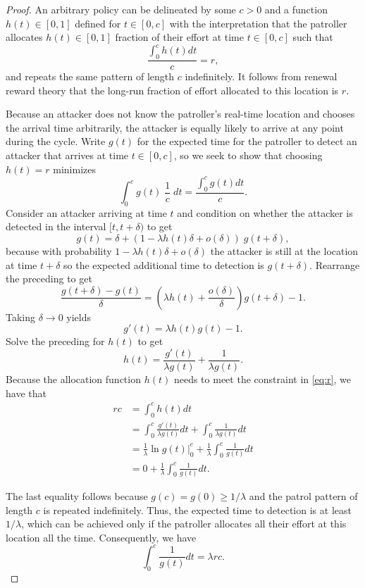 \documentclass[11pt,a4paper]{article}
\begin{document}
\begin{proof}
An arbitrary policy can be delineated by some $c > 0$ and a function $h(t) \in [0,1]$ defined for $t \in [0,c]$ with the interpretation that the patroller allocates $h(t) \in [0,1]$ fraction of their effort at time $t \in [0,c]$ such that
\begin{equation}
\frac{\int_0^c h(t) dt}{c} = r,
\label{eq:r}
\end{equation}
and repeats the same pattern of length $c$ indefinitely.
It follows from renewal reward theory that the long-run fraction of effort allocated to this location is $r$.


Because an attacker does not know the patroller's real-time location and chooses the arrival time arbitrarily, the attacker is equally likely to arrive at any point during the cycle.
Write $g(t)$ for the expected time for the patroller to detect an attacker that arrives at time $t \in [0,c]$, so we seek to show that choosing $h(t) = r$ minimizes
\begin{equation}
\int_0^c g(t) \; \frac{1}{c} \; dt = \frac{\int_0^c g(t) dt}{c}.
\label{eq:obj}
\end{equation}
Consider an attacker arriving at time $t$ and condition on whether the attacker is detected in the interval $[t, t+ \delta)$ to get
\[
g(t) = \delta  + (1 - \lambda h(t) \delta + o (\delta)) \;  g(t+\delta),
\]
because with probability $1 - \lambda h(t) \delta + o (\delta)$ the attacker is still at the location at time $t + \delta$ so the expected additional time to detection is $g (t + \delta)$.
Rearrange the preceding to get
\[
\frac{g(t+ \delta) - g(t)}{\delta} = \left( \lambda h(t) + \frac{o(\delta)}{\delta} \right) g(t+ \delta) - 1.
\]
Taking $\delta \rightarrow 0$ yields
\[
g'(t) = \lambda h(t) g(t) -1.
\]
Solve the preceding for $h(t)$ to get
\[
h(t) = \frac{g'(t)}{\lambda g(t)} + \frac{1}{\lambda g(t)}.
\]
Because the allocation function $h(t)$ needs to meet the constraint in \eqref{eq:r}, we have that
\begin{align*}
r c 
&= \int_0^c h(t) dt \\
&= \int_0^c \frac{g'(t)}{\lambda g(t)} dt +  \int_0^c  \frac{1}{\lambda g(t)} dt \\
&= \frac{1}{\lambda} \ln g(t) \big|_0^c + \frac{1}{\lambda} \int_0^c \frac{1}{g(t)} dt \\
&= 0 + \frac{1}{\lambda} \int_0^c \frac{1}{g(t)} dt.
\end{align*}

The last equality follows because $g(c) = g(0) \geq 1/\lambda$ and the patrol pattern of length $c$ is repeated indefinitely. Thus, the expected time to detection is at least $1/\lambda$, which can be achieved only if the patroller allocates all their effort at this location all the time.
Consequently, we have
\[
\int_0^c \frac{1}{g(t)} dt = \lambda r c.
\]



\end{proof}
\end{document}

